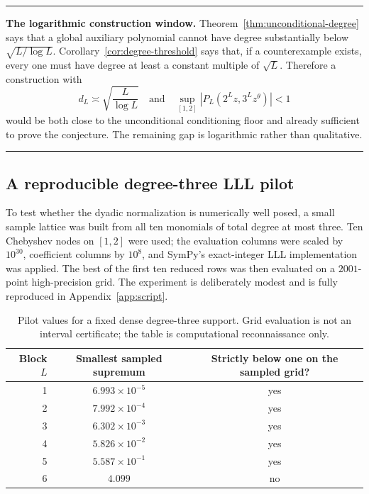 \documentclass[11pt,oneside]{article}
\theoremstyle{definition}
\theoremstyle{remark}
\newcommand{\tht}{\theta}
\newenvironment{resultbox}
{\begin{center}\begin{minipage}{0.95\textwidth}\hrule\vspace{0.5em}}
{\vspace{0.45em}\hrule\end{minipage}\end{center}}
\begin{document}
\begin{resultbox}
\textbf{The logarithmic construction window.}
Theorem~\ref{thm:unconditional-degree} says that a global auxiliary polynomial cannot have degree
substantially below $\sqrt{L/\log L}$.  Corollary~\ref{cor:degree-threshold} says that, if a
counterexample exists, every one must have degree at least a constant multiple of $\sqrt L$.
Therefore a construction with
\[
  d_L\asymp\sqrt{\frac{L}{\log L}}
  \quad\text{and}\quad
  \sup_{[1,2]}|P_L(2^Lz,3^Lz^\tht)|<1
\]
would be both close to the unconditional conditioning floor and already sufficient to prove the
conjecture.  The remaining gap is logarithmic rather than qualitative.
\end{resultbox}

\subsection{A reproducible degree-three LLL pilot}
\label{sec:lll-pilot}

To test whether the dyadic normalization is numerically well posed, a small sample lattice was
built from all ten monomials of total degree at most three.  Ten Chebyshev nodes on $[1,2]$ were
used; the evaluation columns were scaled by $10^{30}$, coefficient columns by $10^8$, and SymPy's
exact-integer LLL implementation was applied.  The best of the first ten reduced rows was then
evaluated on a $2001$-point high-precision grid.  The experiment is deliberately modest and is
fully reproduced in Appendix~\ref{app:script}.

\begin{table}[ht]
\centering
\small
\begin{tabular}{rcc}
\toprule
Block $L$ & Smallest sampled supremum & Strictly below one on the sampled grid? \\
\midrule
1 & $6.993\times10^{-5}$ & yes \\
2 & $7.992\times10^{-4}$ & yes \\
3 & $6.302\times10^{-3}$ & yes \\
4 & $5.826\times10^{-2}$ & yes \\
5 & $5.587\times10^{-1}$ & yes \\
6 & $4.099$              & no \\
\bottomrule
\end{tabular}
\caption{Pilot values for a fixed dense degree-three support.  Grid evaluation is not an interval
certificate; the table is computational reconnaissance only.}
\label{tab:lll-pilot}
\end{table}
\end{document}
